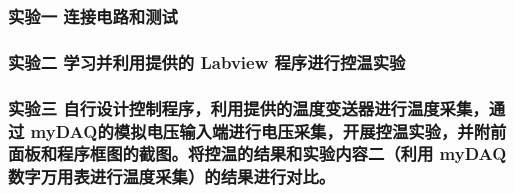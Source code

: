 \documentclass[dvipsnames, svgnames,a4paper,11pt]{article}
\begin{document}
\subsubsection{实验一 \quad 连接电路和测试}
	



\subsubsection{实验二 \quad 学习并利用提供的 Labview 程序进行控温实验}





\subsubsection{实验三 \quad 自行设计控制程序，利用提供的温度变送器进行温度采集，通过 myDAQ的模拟电压输入端进行电压采集，开展控温实验，并附前面板和程序框图的截图。将控温的结果和实验内容二（利用 myDAQ 数字万用表进行温度采集）的结果进行对比。}

				


	
	
\end{document}
